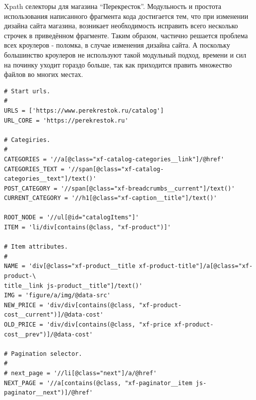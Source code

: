Xpath селекторы для магазина ``Перекресток''. Модульность и простота использования написанного фрагмента кода достигается тем, что при изменении дизайна сайта магазина, возникает необходимость исправить всего несколько строчек в приведённом фрагменте. Таким образом, частично решается проблема всех кроулеров - поломка, в случае изменения дизайна сайта. А поскольку большинство кроулеров не используют такой модульный подход, времени и сил на починку уходит гораздо больше, так как приходится править множество файлов во многих местах.

\begin{small}
    \begin{verbatim}
# Start urls.
#
URLS = ['https://www.perekrestok.ru/catalog']
URL_CORE = 'https://perekrestok.ru'

# Categiries.
#
CATEGORIES = '//a[@class="xf-catalog-categories__link"]/@href'
CATEGORIES_TEXT = '//span[@class="xf-catalog-categories__text"]/text()'
POST_CATEGORY = '//span[@class="xf-breadcrumbs__current"]/text()'
CURRENT_CATEGORY = '//h1[@class="xf-caption__title"]/text()'

ROOT_NODE = '//ul[@id="catalogItems"]'
ITEM = 'li/div[contains(@class, "xf-product")]'

# Item attributes.
#
NAME = 'div[@class="xf-product__title xf-product-title"]/a[@class="xf-product-\
title__link js-product__title"]/text()'
IMG = 'figure/a/img/@data-src'
NEW_PRICE = 'div/div[contains(@class, "xf-product-cost__current")]/@data-cost'
OLD_PRICE = 'div/div[contains(@class, "xf-price xf-product-cost__prev")]/@data-cost'

# Pagination selector.
#
# next_page = '//li[@class="next"]/a/@href'
NEXT_PAGE = '//a[contains(@class, "xf-paginator__item js-paginator__next")]/@href'
    \end{verbatim}
\end{small}
